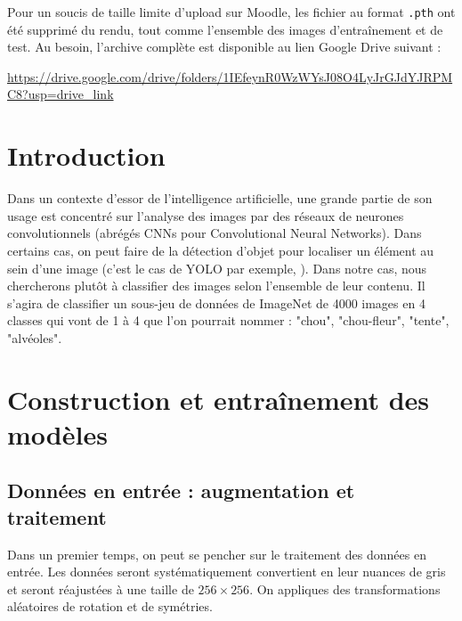 \documentclass{report}
\begin{document}
Pour un soucis de taille limite d'upload sur Moodle, les fichier au format \texttt{.pth} ont été
supprimé du rendu, tout comme l'ensemble des images d'entraînement et de test. Au besoin, l'archive 
complète est disponible au lien Google Drive suivant :

\url{https://drive.google.com/drive/folders/1IEfeynR0WzWYsJ08O4LyJrGJdYJRPMC8?usp=drive_link}

\newpage

\chapter*{Introduction}

Dans un contexte d'essor de l'intelligence artificielle, une grande partie de 
son usage est concentré sur l'analyse des images par des réseaux de neurones 
convolutionnels (abrégés CNNs pour Convolutional Neural Networks). Dans certains 
cas, on peut faire de la détection d'objet pour localiser un élément au sein d'une 
image (c'est le cas de YOLO par exemple, \cite{YOLO_demonstration}). Dans notre cas, 
nous chercherons plutôt à classifier des images selon l'ensemble de leur contenu.
Il s'agira de classifier un sous-jeu de données de ImageNet de 4000 images en 4
classes qui vont de 1 à 4 que l'on pourrait nommer : "chou", "chou-fleur", "tente", 
"alvéoles".

\newpage



\chapter{Construction et entraînement des modèles}

\section{Données en entrée : augmentation et traitement}

Dans un premier temps, on peut se pencher sur le traitement des données en entrée.
Les données seront systématiquement convertient en leur nuances de gris et seront réajustées 
à une taille de $256 \times 256$. On appliques des transformations aléatoires de rotation et 
de symétries.
\end{document}

